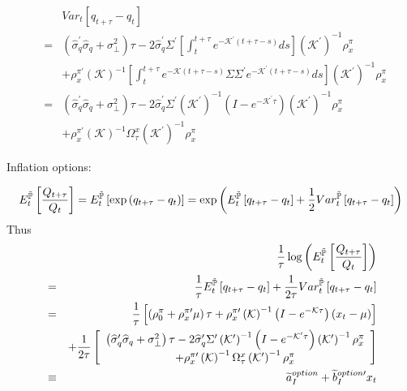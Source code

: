 \documentclass{article}
\begin{document}
\begin{eqnarray*}
&&Var_{t}\left[ q_{t+\tau }-q_{t}\right]  \\
&=&\left( \widehat{\sigma }_{q}^{\prime }\widehat{\sigma }_{q}+\sigma _{\bot
}^{2}\right) \tau -2\widehat{\sigma }_{q}^{\prime }\Sigma ^{\prime }\left[
\int_{t}^{t+\tau }e^{-\mathcal{K}^{\prime }\left( t+\tau -s\right) }ds\right]
\left( \mathcal{K}^{\prime }\right) ^{-1}\rho _{x}^{\pi } \\
&&+\rho _{x}^{\pi \prime }\left( \mathcal{K}\right) ^{-1}\left[
\int_{t}^{t+\tau }e^{-\mathcal{K}\left( t+\tau -s\right) }\Sigma \Sigma
^{\prime }e^{-\mathcal{K}^{\prime }\left( t+\tau -s\right) }ds\right] \left( 
\mathcal{K}^{\prime }\right) ^{-1}\rho _{x}^{\pi } \\
&=&\left( \widehat{\sigma }_{q}^{\prime }\widehat{\sigma }_{q}+\sigma _{\bot
}^{2}\right) \tau -2\widehat{\sigma }_{q}^{\prime }\Sigma ^{\prime }\left( 
\mathcal{K}^{\prime }\right) ^{-1}\left( I-e^{-\mathcal{K}^{\prime }\tau
}\right) \left( \mathcal{K}^{\prime }\right) ^{-1}\rho _{x}^{\pi } \\
&&+\rho _{x}^{\pi \prime }\left( \mathcal{K}\right) ^{-1}\Omega _{\tau
}^{x}\left( \mathcal{K}^{\prime }\right) ^{-1}\rho _{x}^{\pi }
\end{eqnarray*}

Inflation options:

\begin{equation*}
E_{t}^{\mathbb{\tilde{P}}}\left[ \frac{Q_{t+\tau }}{Q_{t}}\right] =E_{t}^{%
\mathbb{\tilde{P}}}\left[ \exp \left( q_{t+\tau }-q_{t}\right) \right] =\exp
\left( E_{t}^{\mathbb{\tilde{P}}}\left[ q_{t+\tau }-q_{t}\right] +\frac{1}{2}%
Var_{t}^{\mathbb{\tilde{P}}}\left[ q_{t+\tau }-q_{t}\right] \right)
\end{equation*}%
Thus%
\begin{eqnarray*}
&&\frac{1}{\tau }\log \left( E_{t}^{\mathbb{\tilde{P}}}\left[ \frac{%
Q_{t+\tau }}{Q_{t}}\right] \right) \\
&=&\frac{1}{\tau }E_{t}^{\mathbb{\tilde{P}}}\left[ q_{t+\tau }-q_{t}\right] +%
\frac{1}{2\tau }Var_{t}^{\mathbb{\tilde{P}}}\left[ q_{t+\tau }-q_{t}\right]
\\
&=&\frac{1}{\tau }\left[ \left( \rho _{0}^{\pi }+\rho _{x}^{\pi \prime }\mu
\right) \tau +\rho _{x}^{\pi \prime }\left( \mathcal{K}\right) ^{-1}\left(
I-e^{-\mathcal{K}\tau }\right) \left( x_{t}-\mu \right) \right] \\
&&+\frac{1}{2\tau }\left[ 
\begin{array}{c}
\left( \widehat{\sigma }_{q}^{\prime }\widehat{\sigma }_{q}+\sigma _{\bot
}^{2}\right) \tau -2\widehat{\sigma }_{q}^{\prime }\Sigma ^{\prime }\left( 
\mathcal{K}^{\prime }\right) ^{-1}\left( I-e^{-\mathcal{K}^{\prime }\tau
}\right) \left( \mathcal{K}^{\prime }\right) ^{-1}\rho _{x}^{\pi } \\ 
+\rho _{x}^{\pi \prime }\left( \mathcal{K}\right) ^{-1}\Omega _{\tau
}^{x}\left( \mathcal{K}^{\prime }\right) ^{-1}\rho _{x}^{\pi }%
\end{array}%
\right] \\
&\equiv &\widetilde{a}_{I}^{option}+\widetilde{b}_{I}^{option\prime }x_{t}
\end{eqnarray*}
\end{document}
